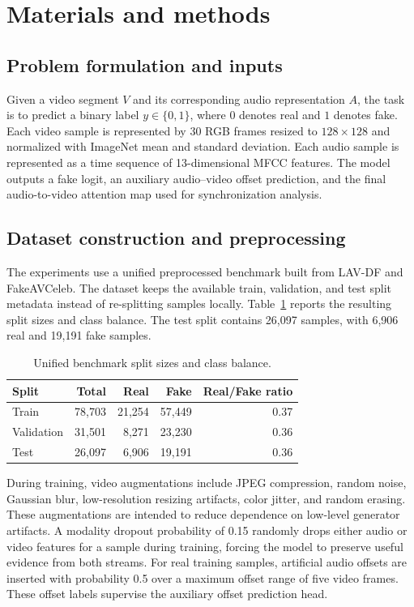 \documentclass[preprint,12pt,number]{elsarticle}
\begin{document}
\section{Materials and methods}
\label{sec:method}

\subsection{Problem formulation and inputs}
\label{subsec:formulation}

Given a video segment $V$ and its corresponding audio representation $A$, the task is to predict a binary label $y \in \{0,1\}$, where $0$ denotes real and $1$ denotes fake. Each video sample is represented by 30 RGB frames resized to $128 \times 128$ and normalized with ImageNet mean and standard deviation. Each audio sample is represented as a time sequence of 13-dimensional MFCC features. The model outputs a fake logit, an auxiliary audio--video offset prediction, and the final audio-to-video attention map used for synchronization analysis.

\subsection{Dataset construction and preprocessing}
\label{subsec:data}

The experiments use a unified preprocessed benchmark built from LAV-DF and FakeAVCeleb. The dataset keeps the available train, validation, and test split metadata instead of re-splitting samples locally. Table~\ref{tab:splits} reports the resulting split sizes and class balance. The test split contains 26,097 samples, with 6,906 real and 19,191 fake samples.

\begin{table}[H]
\caption{Unified benchmark split sizes and class balance.}
\label{tab:splits}
\centering
\begin{tabular}{lrrrr}
\toprule
Split & Total & Real & Fake & Real/Fake ratio \\
\midrule
Train & 78,703 & 21,254 & 57,449 & 0.37 \\
Validation & 31,501 & 8,271 & 23,230 & 0.36 \\
Test & 26,097 & 6,906 & 19,191 & 0.36 \\
\bottomrule
\end{tabular}
\end{table}

During training, video augmentations include JPEG compression, random noise, Gaussian blur, low-resolution resizing artifacts, color jitter, and random erasing. These augmentations are intended to reduce dependence on low-level generator artifacts. A modality dropout probability of 0.15 randomly drops either audio or video features for a sample during training, forcing the model to preserve useful evidence from both streams. For real training samples, artificial audio offsets are inserted with probability 0.5 over a maximum offset range of five video frames. These offset labels supervise the auxiliary offset prediction head.
\end{document}
